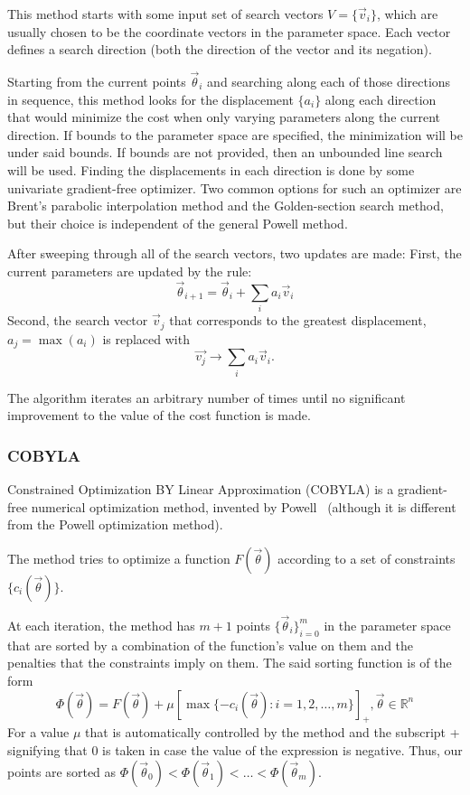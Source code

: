 \documentclass[a4paper,12pt]{article}
\newcommand{\thetas}{\vec{\theta}}
\begin{document}
This method starts with some input set of search vectors $V = \{\vec{v}_i\}$, which are usually chosen to be the coordinate vectors in the parameter space. Each vector defines a search direction (both the direction of the vector and its negation).

Starting from the current points $\thetas_i$ and searching along each of those directions in sequence, this method looks for the displacement $\{a_i\}$ along each direction that would minimize the cost when only varying parameters along the current direction.
If bounds to the parameter space are specified, the minimization will be under said bounds. If bounds are not provided, then an unbounded line search will be used.
Finding the displacements in each direction is done by some univariate gradient-free optimizer.
Two common options for such an optimizer are Brent's parabolic interpolation method and the Golden-section search method, but their choice is independent of the general Powell method.

After sweeping through all of the search vectors, two updates are made:
First, the current parameters are updated by the rule:
\begin{equation}
    \thetas_{i+1} = \thetas_{i} + \sum_i a_i \vec{v}_i
\end{equation}
Second, the search vector $\vec{v}_j$ that corresponds to the greatest displacement, $a_j = \max(a_i)$ is replaced with
\begin{equation}
    \vec{v_j} \to \sum_i a_i \vec{v}_i.
\end{equation}

The algorithm iterates an arbitrary number of times until no significant improvement to the value of the cost function is made.


\subsubsection{COBYLA}
Constrained Optimization BY Linear Approximation (COBYLA) is a gradient-free numerical optimization method, invented by Powell~\cite{Powell1994,powell_view_2007} (although it is different from the Powell optimization method).

The method tries to optimize a function $F(\thetas)$ according to a set of constraints $\{c_i(\thetas)\}$.

At each iteration, the method has $m+1$ points $\{\thetas_i\}_{i=0}^m$ in the parameter space that are sorted by a combination of the function's value on them and the penalties that the constraints imply on them.
The said sorting function is of the form
\begin{equation}
    \Phi(\thetas) = F(\thetas) + \mu[ \max\{-c_i(\thetas) : i=1,2,\dots,m \} ]_+, \thetas \in \mathbb{R}^n
\end{equation}
For a value $\mu$ that is automatically controlled by the method and the subscript + signifying that 0 is taken in case the value of the expression is negative.
Thus, our points are sorted as $\Phi(\thetas_0) < \Phi(\thetas_1) < \dots < \Phi(\thetas_m)$.
\end{document}
